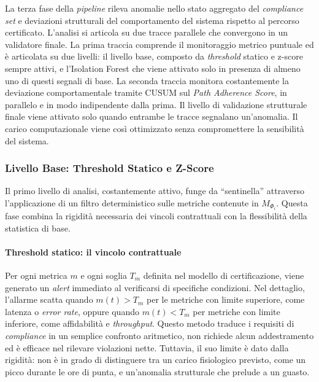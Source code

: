 La terza fase della \textit{pipeline} rileva anomalie nello stato aggregato del \textit{compliance
set} e deviazioni strutturali del comportamento del sistema rispetto al percorso certificato.
L'analisi si articola su due tracce parallele che convergono in un validatore finale. La prima
traccia comprende il monitoraggio metrico puntuale ed è articolata su due livelli:
il livello base, composto da \textit{threshold} statico e z-score sempre attivi, e l'Isolation Forest che viene
attivato solo in presenza di almeno uno di questi segnali di base. La seconda traccia monitora costantemente la deviazione
comportamentale tramite \gls{CUSUM} sul \textit{Path Adherence Score}, in parallelo e in modo
indipendente dalla prima. Il livello di validazione strutturale finale viene attivato solo quando
entrambe le tracce segnalano un'anomalia. Il carico computazionale viene così ottimizzato senza
compromettere la sensibilità del sistema.

\subsubsection{Livello Base: Threshold Statico e Z-Score}
\label{sec:threshold_zscore}

Il primo livello di analisi, costantemente attivo, funge da ``sentinella'' attraverso l'applicazione
di un filtro deterministico sulle metriche contenute in $M_{\Phi_i}$. Questa fase combina la
rigidità necessaria dei vincoli contrattuali con la flessibilità della statistica di base.

\paragraph{Threshold statico: il vincolo contrattuale}

Per ogni metrica $m$ e ogni soglia $T_m$ definita nel modello di certificazione, viene
generato un \textit{alert} immediato al verificarsi di specifiche condizioni. Nel dettaglio, 
l'allarme scatta quando $m(t) > T_m$ per le metriche con limite superiore, come latenza o
\textit{error rate}, oppure quando $m(t) < T_m$ per metriche con limite inferiore, come affidabilità
e \textit{throughput}. Questo metodo traduce i requisiti di \textit{compliance} in un semplice 
confronto aritmetico, non richiede alcun addestramento ed è efficace nel rilevare violazioni nette. 
Tuttavia, il suo limite è dato dalla rigidità: non è in grado di distinguere tra un carico 
fisiologico previsto, come un picco durante le ore di punta, e un'anomalia strutturale che prelude a un guasto.


